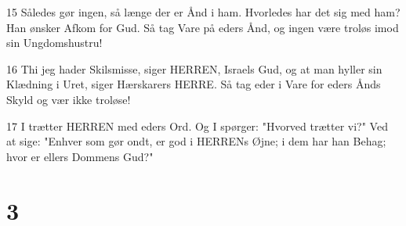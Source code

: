 \par 15 Således gør ingen, så længe der er Ånd i ham. Hvorledes har det sig med ham? Han ønsker Afkom for Gud. Så tag Vare på eders Ånd, og ingen være troløs imod sin Ungdomshustru!
\par 16 Thi jeg hader Skilsmisse, siger HERREN, Israels Gud, og at man hyller sin Klædning i Uret, siger Hærskarers HERRE. Så tag eder i Vare for eders Ånds Skyld og vær ikke troløse!
\par 17 I trætter HERREN med eders Ord. Og I spørger: "Hvorved trætter vi?" Ved at sige: "Enhver som gør ondt, er god i HERRENs Øjne; i dem har han Behag; hvor er ellers Dommens Gud?"

\chapter{3}

